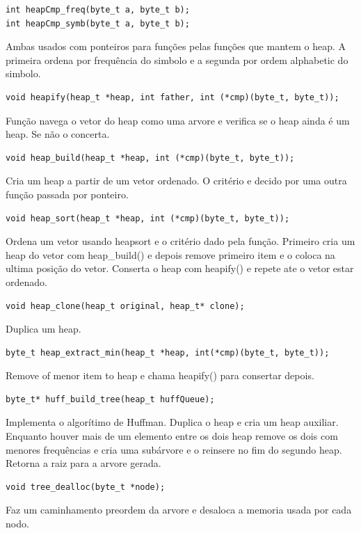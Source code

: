 \documentclass[a4paper, 11pt]{article}
\begin{document}
\begin{verbatim}
int heapCmp_freq(byte_t a, byte_t b);
int heapCmp_symb(byte_t a, byte_t b);
\end{verbatim} 
Ambas usados com ponteiros para funções pelas funções que mantem o heap. A primeira ordena por frequência do simbolo e a segunda por ordem alphabetic do simbolo.

\begin{verbatim}
void heapify(heap_t *heap, int father, int (*cmp)(byte_t, byte_t));
\end{verbatim} 
Função navega o vetor do heap como uma arvore e verifica se o heap ainda é um heap. Se não o concerta.

\begin{verbatim}
void heap_build(heap_t *heap, int (*cmp)(byte_t, byte_t));
\end{verbatim} 
Cria um heap a partir de um vetor ordenado. O critério e decido por uma outra função passada por ponteiro.

\begin{verbatim}
void heap_sort(heap_t *heap, int (*cmp)(byte_t, byte_t));
\end{verbatim} 
Ordena um vetor usando heapsort e o critério dado pela função. Primeiro cria um heap do vetor com heap\_build() e depois remove primeiro item e o coloca na ultima posição do vetor. Conserta o heap com heapify() e repete ate o vetor estar ordenado.

\begin{verbatim}
void heap_clone(heap_t original, heap_t* clone);
\end{verbatim} 
Duplica um heap.

\begin{verbatim}
byte_t heap_extract_min(heap_t *heap, int(*cmp)(byte_t, byte_t));
\end{verbatim} 
Remove of menor item to heap e chama heapify() para consertar depois.

\begin{verbatim}
byte_t* huff_build_tree(heap_t huffQueue);
\end{verbatim} 
Implementa o algorítimo de Huffman. Duplica o heap e cria um heap auxiliar. Enquanto houver mais de um elemento entre os dois heap remove os dois com menores frequências e cria uma subárvore e o reinsere no fim do segundo heap. Retorna a raiz para a arvore gerada.

\begin{verbatim}
void tree_dealloc(byte_t *node);
\end{verbatim} 
Faz um caminhamento preordem da arvore e desaloca a memoria usada por cada nodo.
\end{document}
